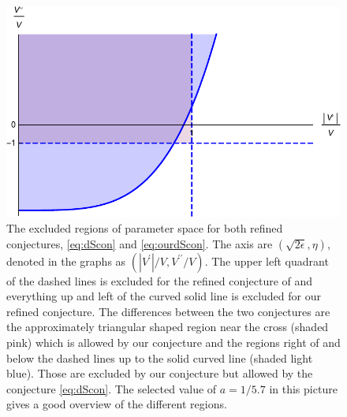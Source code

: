 \documentclass[12pt]{report}
\begin{document}
\begin{figure}[htp]
     \centering
     \includegraphics[scale=0.85]{conreg3.pdf}
     \caption{The excluded regions of parameter space for both refined conjectures, \eqref{eq:dScon} and \eqref{eq:ourdScon}. The axis are $(\sqrt{2\epsilon},\eta)$, denoted in the graphs as $(|V^ \prime|/V,V^ {\prime \prime}/V)$. The upper left quadrant of the dashed lines is excluded for the refined conjecture of \cite{Ooguri:2018wrx} and everything up and left of the curved solid line is excluded for our refined conjecture. The differences between the two conjectures are the approximately triangular shaped region near the cross (shaded pink) which is allowed by our conjecture and the regions right of and below the dashed lines up to the solid curved line (shaded light blue). Those are excluded by our conjecture but allowed by the conjecture \eqref{eq:dScon}. The selected value of $a = 1/5.7$ in this picture gives a good overview of the different regions.}
     \label{fig:conjreg}
\end{figure}
\end{document}

